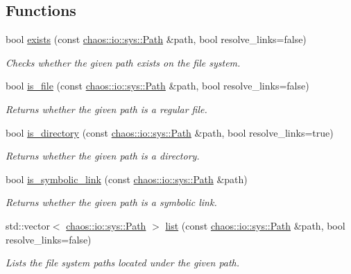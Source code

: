 \subsection*{Functions}
\begin{DoxyCompactItemize}
\item 
bool \hyperlink{namespacechaos_1_1io_1_1sys_ae8f4abc1388c24e0ce7a655a50cd0212}{exists} (const \hyperlink{classchaos_1_1io_1_1sys_1_1_path}{chaos\-::io\-::sys\-::\-Path} \&path, bool resolve\-\_\-links=false)
\begin{DoxyCompactList}\small\item\em Checks whether the given path exists on the file system. \end{DoxyCompactList}\item 
bool \hyperlink{namespacechaos_1_1io_1_1sys_a2afa9dc6f049b03265731be671dbcb17}{is\-\_\-file} (const \hyperlink{classchaos_1_1io_1_1sys_1_1_path}{chaos\-::io\-::sys\-::\-Path} \&path, bool resolve\-\_\-links=false)
\begin{DoxyCompactList}\small\item\em Returns whether the given path is a regular file. \end{DoxyCompactList}\item 
bool \hyperlink{namespacechaos_1_1io_1_1sys_ad48945ad68ee4c84a37240ebc6b5a167}{is\-\_\-directory} (const \hyperlink{classchaos_1_1io_1_1sys_1_1_path}{chaos\-::io\-::sys\-::\-Path} \&path, bool resolve\-\_\-links=true)
\begin{DoxyCompactList}\small\item\em Returns whether the given path is a directory. \end{DoxyCompactList}\item 
bool \hyperlink{namespacechaos_1_1io_1_1sys_ac47b8476aea536b08a1c7a34b4e7e28c}{is\-\_\-symbolic\-\_\-link} (const \hyperlink{classchaos_1_1io_1_1sys_1_1_path}{chaos\-::io\-::sys\-::\-Path} \&path)
\begin{DoxyCompactList}\small\item\em Returns whether the given path is a symbolic link. \end{DoxyCompactList}\item 
std\-::vector$<$ \hyperlink{classchaos_1_1io_1_1sys_1_1_path}{chaos\-::io\-::sys\-::\-Path} $>$ \hyperlink{namespacechaos_1_1io_1_1sys_ad9a4b38dc5e32ab7b0ccf0153d7ed388}{list} (const \hyperlink{classchaos_1_1io_1_1sys_1_1_path}{chaos\-::io\-::sys\-::\-Path} \&path, bool resolve\-\_\-links=false)
\begin{DoxyCompactList}\small\item\em Lists the file system paths located under the given path. \end{DoxyCompactList}\item 

\end{DoxyCompactItemize}
